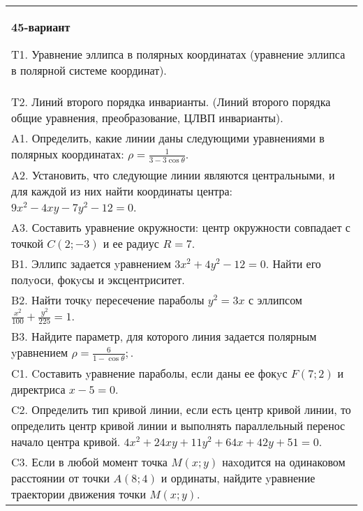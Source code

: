 \documentclass{article}
\begin{document}
\begin{tabular}{m{17cm}}
\textbf{45-вариант}
\newline

T1. Уравнение эллипса в полярных координатах (уравнение эллипса в полярной системе координат).\\

T2. Линий второго порядка инварианты. (Линий второго порядка общие уравнения, преобразование, ЦЛВП инварианты).\\

A1. Определить, какие линии даны следующими уравнениями в полярных координатах: $\rho=\frac{1}{3-3\cos\theta}$.\\

A2. Установить, что следующие линии являются центральными, и для каждой из них найти координаты центра: $9x^{2}-4xy-7y^{2}-12=0$.\\

A3. Составить уравнение окружности: центр окружности совпадает с точкой $C(2;-3)$ и ее радиус $R=7$.\\

B1. Эллипс задается yравнением $3x^{2} + 4y^{2} - 12 = 0$. Найти его полyоси, фокyсы и эксцентриситет.  \\

B2. Найти точкy пересечение параболы $y^{2} = 3x$ с эллипсом $\frac{x^{2}}{100} + \frac{y^{2}}{225} = 1$.  \\

B3. Найдите параметр, для которого линия задается полярным yравнением $\rho = \frac{6}{1 - \cos \theta};$.  \\

C1. Cоставить yравнение параболы, если даны ее фокyс $F(7;2)$ и директриса $x-5=0$.  \\

C2. Определить тип кривой линии, если есть центр кривой линии, то определить центр кривой линии и выполнять параллельный перенос начало центра кривой. $4x^{2}+24xy+11y^{2}+64x+42y+51=0$.  \\

C3. Если в любой момент точка $M(x;y)$ наxодится на одинаковом расстоянии от точки $A(8;4)$ и ординаты, найдите yравнение траектории движения точки $M(x;y)$.  \\

\end{tabular}
\vspace{1cm}
\end{document}
